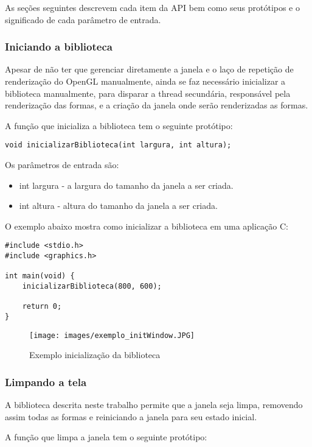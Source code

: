 \documentclass[12pt, %
openright,
oneside, %
a4paper,    %
brazil]{facom-ufu-abntex2}
\begin{document}
As seções seguintes descrevem cada item da API bem como seus protótipos e o significado de cada parâmetro de entrada.

\subsubsection{Iniciando a biblioteca}
Apesar de não ter que gerenciar diretamente a janela e o laço de repetição de renderização do OpenGL manualmente, ainda se faz necessário inicializar a biblioteca manualmente, para disparar a thread secundária, responsável pela renderização das formas, e a criação da janela onde serão renderizadas as formas.

A função que inicializa a biblioteca tem o seguinte protótipo:

\begin{lstlisting}
void inicializarBiblioteca(int largura, int altura);
\end{lstlisting}

Os parâmetros de entrada são:

\begin{itemize}
    \item int largura - a largura do tamanho da janela a ser criada.
    \item int altura -  altura do tamanho da janela a ser criada.
\end{itemize}

O exemplo abaixo mostra como inicializar a biblioteca em uma aplicação C:
\begin{lstlisting}
#include <stdio.h>
#include <graphics.h>

int main(void) {
    inicializarBiblioteca(800, 600);
    
    return 0;
}
\end{lstlisting}

\begin{figure}[!htbp]
  \centering
  \texttt{[image: images/exemplo\_initWindow.JPG]}
  \caption{Exemplo inicialização da biblioteca}
  \label{fig:exemplo_initWindow}
\end{figure}

\subsubsection{Limpando a tela}
A biblioteca descrita neste trabalho permite que a janela seja limpa, removendo assim todas as formas e reiniciando a janela para seu estado inicial.

A função que limpa a janela tem o seguinte protótipo:
\end{document}

